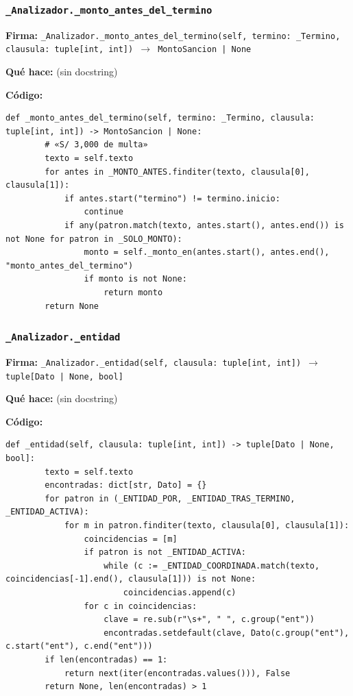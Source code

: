 \documentclass[11pt,a4paper]{article}
\begin{document}
\subsubsection*{\texttt{\_Analizador.\_monto\_antes\_del\_termino}}
\textbf{Firma:} \texttt{\_Analizador.\_monto\_antes\_del\_termino(self, termino: \_Termino, clausula: tuple[int, int]) $\rightarrow$ MontoSancion | None}

\textbf{Qué hace:} (sin docstring)

\textbf{Código:}
\begin{lstlisting}
def _monto_antes_del_termino(self, termino: _Termino, clausula: tuple[int, int]) -> MontoSancion | None:
        # «S/ 3,000 de multa»
        texto = self.texto
        for antes in _MONTO_ANTES.finditer(texto, clausula[0], clausula[1]):
            if antes.start("termino") != termino.inicio:
                continue
            if any(patron.match(texto, antes.start(), antes.end()) is not None for patron in _SOLO_MONTO):
                monto = self._monto_en(antes.start(), antes.end(), "monto_antes_del_termino")
                if monto is not None:
                    return monto
        return None
\end{lstlisting}

\subsubsection*{\texttt{\_Analizador.\_entidad}}
\textbf{Firma:} \texttt{\_Analizador.\_entidad(self, clausula: tuple[int, int]) $\rightarrow$ tuple[Dato | None, bool]}

\textbf{Qué hace:} (sin docstring)

\textbf{Código:}
\begin{lstlisting}
def _entidad(self, clausula: tuple[int, int]) -> tuple[Dato | None, bool]:
        texto = self.texto
        encontradas: dict[str, Dato] = {}
        for patron in (_ENTIDAD_POR, _ENTIDAD_TRAS_TERMINO, _ENTIDAD_ACTIVA):
            for m in patron.finditer(texto, clausula[0], clausula[1]):
                coincidencias = [m]
                if patron is not _ENTIDAD_ACTIVA:
                    while (c := _ENTIDAD_COORDINADA.match(texto, coincidencias[-1].end(), clausula[1])) is not None:
                        coincidencias.append(c)
                for c in coincidencias:
                    clave = re.sub(r"\s+", " ", c.group("ent"))
                    encontradas.setdefault(clave, Dato(c.group("ent"), c.start("ent"), c.end("ent")))
        if len(encontradas) == 1:
            return next(iter(encontradas.values())), False
        return None, len(encontradas) > 1
\end{lstlisting}
\end{document}
